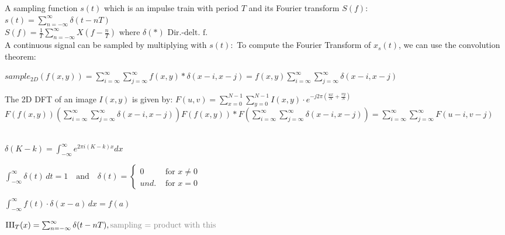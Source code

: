 \color{definitionColor}
 \color{black}

A sampling function $s(t)$ which is an impulse train with period $T$ and its Fourier transform $S(f)$:\\
\color{gray}
$s(t) = \sum_{n = -\infty}^\infty \delta\left(t - nT\right)$\\
$ S(f) = \frac{1}{T} \sum_{n = -\infty}^\infty X(f - \frac{n}{T}) \text{ where } \delta(*) \text{  Dir.-delt. f.}$\\
\color{black}
A continuous signal can be sampled by multiplying with $s(t):$ To compute the Fourier Transform of $x_s(t)$, we can use the convolution theorem:


 $sample_{2D} (f(x, y)) = \sum_{i = \infty}^{\infty} \sum_{j = \infty}^{\infty} f(x, y) * \delta(x - i, x - j) = f(x, y) \sum_{i = \infty}^{\infty}\sum_{j = \infty}^{\infty}\delta(x - i, x - j)$

The 2D DFT of an image \( I(x, y) \) is given by:
$F(u, v) = \sum_{x=0}^{N-1} \sum_{y=0}^{N-1} I(x, y) \cdot e^{-j2\pi\left(\frac{ux}{N} + \frac{vy}{N}\right)} $
$ F(f(x, y))  (\sum_{i = \infty}^{\infty}\sum_{j = \infty}^{\infty}\delta(x - i, x - j)) F(f(x, y)) * F( \sum_{i = \infty}^{\infty}\sum_{j = \infty}^{\infty}\delta(x - i, x - j)) =  \sum_{i = \infty}^{\infty}\sum_{j = \infty}^{\infty} F(u - i, v - j)$

 \\
$\delta (K - k) =  \int_{-\infty}^{\infty}e^{2 \pi i(K - k)x} dx$

$\int_{-\infty}^{\infty} \delta(t) \, dt = 1 \quad \text{and} \quad \delta(t) =  \begin{cases} 0 & \text{ for } x \neq 0 \\ und. & \text{ for } x = 0 \end{cases}$


\color{black} 
$\int_{-\infty}^{\infty} f(t) \cdot \delta(x - a) \, dx = f(a)$


$\text{III}_T(x) = \sum_{n=-\infty}^{\infty} \delta(t - nT),\\ \color{gray} \text{sampling = product with this}$

